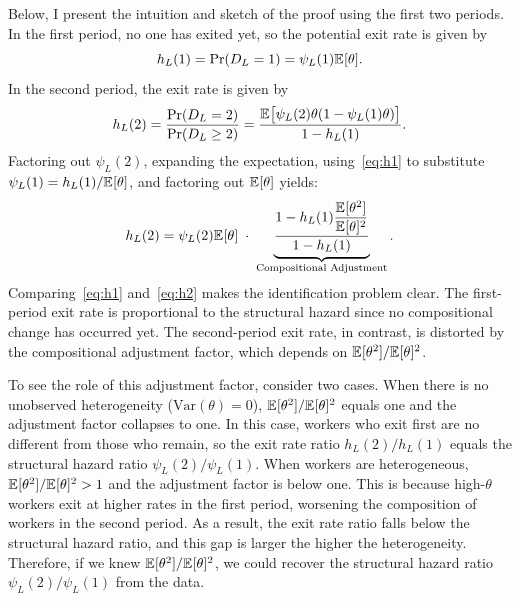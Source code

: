 \documentclass{div}
\begin{document}
Below, I present the intuition and sketch of the proof using the first two periods. In the first period, no one has exited yet, so the potential exit rate is given by
\begin{equation}\label{eq:h1}
h_L(1) = \Pr(D_L = 1) = \psi_L(1)\E[\theta].
\end{equation}
In the second period, the exit rate is given by
\[
h_L(2) = \frac{\Pr(D_L = 2)}{\Pr(D_L \geq 2)} = \frac{\E\big[\psi_L(2)\theta(1 - \psi_L(1)\theta)\big]}{1 - h_L(1)}.
\]
Factoring out $\psi_L(2)$, expanding the expectation, using~\eqref{eq:h1} to substitute $\psi_L(1) = h_L(1)/\E[\theta]$, and factoring out $\E[\theta]$ yields:
\begin{equation}\label{eq:h2}
h_L(2) = \psi_L(2)\E[\theta] \;\cdot\; \underbrace{\frac{1 - h_L(1)\dfrac{\E[\theta^2]}{\E[\theta]^2}}{1 - h_L(1)}}_{\text{Compositional Adjustment}}.
\end{equation}
Comparing~\eqref{eq:h1} and~\eqref{eq:h2} makes the identification problem clear. The first-period exit rate is proportional to the structural hazard since no compositional change has occurred yet. The second-period exit rate, in contrast, is distorted by the compositional adjustment factor, which depends on $\E[\theta^2]/\E[\theta]^2$.

To see the role of this adjustment factor, consider two cases. When there is no unobserved heterogeneity ($\mathrm{Var}(\theta) = 0$), $\E[\theta^2]/\E[\theta]^2$ equals one and the adjustment factor collapses to one. In this case, workers who exit first are no different from those who remain, so the exit rate ratio $h_L(2)/h_L(1)$ equals the structural hazard ratio $\psi_L(2)/\psi_L(1)$. When workers are heterogeneous, $\E[\theta^2]/\E[\theta]^2 > 1$ and the adjustment factor is below one. This is because high-$\theta$ workers exit at higher rates in the first period, worsening the composition of workers in the second period. As a result, the exit rate ratio falls below the structural hazard ratio, and this gap is larger the higher the heterogeneity. Therefore, if we knew $\E[\theta^2]/\E[\theta]^2$, we could recover the structural hazard ratio $\psi_L(2)/\psi_L(1)$ from the data.
\end{document}
